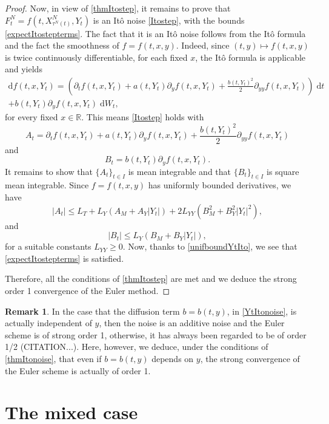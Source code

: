 \documentclass[reqno,12pt]{amsart}
\theoremstyle{plain}%
\theoremstyle{definition}
\newtheorem{rmk}{Remark}[section]
\begin{document}
\begin{proof}
    Now, in view of \cref{thmItostep}, it remains to prove that $F_t^N = f(t, X_{\tau^N(t)}^N, Y_t)$ is an It\^o noise  \eqref{Itostep}, with the bounds \eqref{expectItostepterms}. The fact that it is an It\^o noise follows from the It\^o formula and the fact the smoothness of $f=f(t, x, y)$. Indeed, since $(t, y) \mapsto f(t, x, y)$ is twice continuously differentiable, for each fixed $x$, the It\^o formula is applicable and yields
    \begin{multline}
        \label{itoformula}
            \mathrm{d}f(t, x, Y_t) = \left(\partial_t f(t, x, Y_t) + a(t, Y_t) \partial_y f(t, x, Y_t)  + \frac{b(t, Y_t)^2}{2}\partial_{yy}f(t, x, Y_t) \right) \;\mathrm{d}t \\ + b(t, Y_t) \partial_y f(t, x, Y_t)\;\mathrm{d}W_t,
        \end{multline}
    for every fixed $x\in \mathbb{R}$. This means \eqref{Itostep} holds with
    \[
        A_t = \partial_t f(t, x, Y_t) + a(t, Y_t) \partial_y f(t, x, Y_t)  + \frac{b(t, Y_t)^2}{2}\partial_{yy}f(t, x, Y_t)
    \]
    and
    \[
        B_t = b(t, Y_t) \partial_y f(t, x, Y_t).
    \]
    It remains to show that $\{A_t\}_{t\in I}$ is mean integrable and that $\{B_t\}_{t\in I}$ is square mean integrable. Since $f=f(t, x, y)$ has uniformly bounded derivatives, we have
    \[
        |A_t| \leq L_T + L_Y(A_M + A_Y|Y_t|) + 2L_{YY}(B_M^2 + B_Y^2|Y_t|^2),
    \]
    and
    \[
        |B_t| \leq L_Y (B_M + B_Y |Y_t|),
    \]
    for a suitable constants $L_{YY}\geq 0$. Now, thanks to \eqref{unifboundYtIto}, we see that \eqref{expectItostepterms} is satisfied.

    Therefore, all the conditions of \cref{thmItostep} are met and we deduce the strong order 1 convergence of the Euler method.
\end{proof}

\begin{rmk}
    In the case that the diffusion term $b = b(t, y)$, in \eqref{YtItonoise}, is actually independent of $y$, then the noise is an additive noise and the Euler scheme is of strong order 1, otherwise, it has always been regarded to be of order 1/2 (CITATION...). Here, however, we deduce, under the conditions of \cref{thmItonoise}, that even if $b=b(t, y)$ depends on $y$, the strong convergence of the Euler scheme is actually of order 1.    
\end{rmk}

\section{The mixed case}
\label{secmixed}
\end{document}
